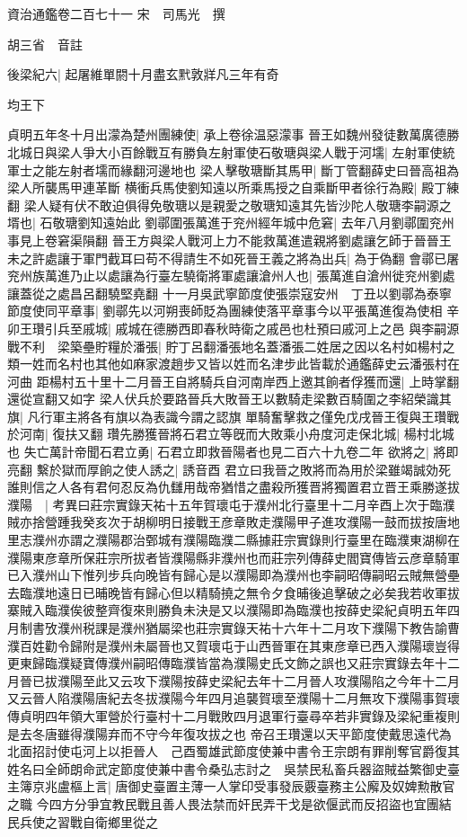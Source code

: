 資治通鑑卷二百七十一
宋　司馬光　撰

胡三省　音註

後梁紀六|{
	起屠維單閼十月盡玄黓敦牂凡三年有奇}


均王下

貞明五年冬十月出濛為楚州團練使|{
	承上卷徐温惡濛事}
晉王如魏州發徒數萬廣德勝北城日與梁人爭大小百餘戰互有勝負左射軍使石敬瑭與梁人戰于河壖|{
	左射軍使統軍士之能左射者壖而緣翻河邊地也}
梁人擊敬瑭斷其馬甲|{
	斷丁管翻薛史曰晉高祖為梁人所襲馬甲連革斷}
横衝兵馬使劉知遠以所乘馬授之自乘斷甲者徐行為殿|{
	殿丁練翻}
梁人疑有伏不敢迫俱得免敬瑭以是親愛之敬瑭知遠其先皆沙陀人敬瑭李嗣源之壻也|{
	石敬瑭劉知遠始此}
劉鄩圍張萬進于兖州經年城中危窘|{
	去年八月劉鄩圍兖州事見上卷窘渠隕翻}
晉王方與梁人戰河上力不能救萬進遣親將劉處讓乞師于晉晉王未之許處讓于軍門截耳曰苟不得請生不如死晉王義之將為出兵|{
	為于偽翻}
會鄩已屠兖州族萬進乃止以處讓為行臺左驍衛將軍處讓滄州人也|{
	張萬進自滄州徙兖州劉處讓蓋從之處昌呂翻驍堅堯翻}
十一月吳武寧節度使張崇寇安州　丁丑以劉鄩為泰寧節度使同平章事|{
	劉鄩先以河朔喪師貶為團練使落平章事今以平張萬進復為使相}
辛卯王瓚引兵至戚城|{
	戚城在德勝西即春秋時衛之戚邑也杜預曰戚河上之邑}
與李嗣源戰不利　梁築壘貯糧於潘張|{
	貯丁呂翻潘張地名蓋潘張二姓居之因以名村如楊村之類一姓而名村也其他如麻家渡趙步又皆以姓而名津步此皆載於通鑑薛史云潘張村在河曲}
距楊村五十里十二月晉王自將騎兵自河南岸西上邀其餉者俘獲而還|{
	上時掌翻還從宣翻又如字}
梁人伏兵於要路晉兵大敗晉王以數騎走梁數百騎圍之李紹榮識其旗|{
	凡行軍主將各有旗以為表識今謂之認旗}
單騎奮擊救之僅免戊戌晉王復與王瓚戰於河南|{
	復扶又翻}
瓚先勝獲晉將石君立等旣而大敗乘小舟度河走保北城|{
	楊村北城也}
失亡萬計帝聞石君立勇|{
	石君立即救晉陽者也見二百六十九卷二年}
欲將之|{
	將即亮翻}
繫於獄而厚餉之使人誘之|{
	誘音酉}
君立曰我晉之敗將而為用於梁雖竭誠効死誰則信之人各有君何忍反為仇讎用哉帝猶惜之盡殺所獲晋將獨置君立晋王乘勝遂拔濮陽　|{
	考異曰莊宗實錄天祐十五年賀瓌屯于濮州北行臺里十二月辛酉上次于臨濮賊亦捨營踵我癸亥次于胡柳明日接戰王彦章敗走濮陽甲子進攻濮陽一鼓而拔按唐地里志濮州亦謂之濮陽郡治鄄城有濮陽臨濮二縣據莊宗實錄則行臺里在臨濮東湖柳在濮陽東彦章所保莊宗所拔者皆濮陽縣非濮州也而莊宗列傳薛史閻寶傳皆云彦章騎軍已入濮州山下惟列步兵向晚皆有歸心是以濮陽即為濮州也李嗣昭傳嗣昭云賊無營壘去臨濮地遠日已晡晚皆有歸心但以精騎撓之無令夕食晡後追擊破之必矣我若收軍拔寨賊入臨濮俟彼整齊復來則勝負未決是又以濮陽即為臨濮也按薛史梁紀貞明五年四月制書攷濮州税課是濮州猶屬梁也莊宗實錄天祐十六年十二月攻下濮陽下教告諭曹濮百姓勸令歸附是濮州未屬晉也又賀瓌屯于山西晉軍在其東彦章已西入濮陽瓌豈得更東歸臨濮疑寶傳濮州嗣昭傳臨濮皆當為濮陽史氏文飾之誤也又莊宗實錄去年十二月晉已拔濮陽至此又云攻下濮陽按薛史梁紀去年十二月晉人攻濮陽陷之今年十二月又云晉人陷濮陽唐紀去冬拔濮陽今年四月追襲賀瓌至濮陽十二月無攻下濮陽事賀瓌傳貞明四年領大軍營於行臺村十二月戰敗四月退軍行臺尋卒若非實錄及梁紀重複則是去冬唐雖得濮陽弃而不守今年復攻拔之也}
帝召王瓚還以天平節度使戴思遠代為北面招討使屯河上以拒晉人　己酉蜀雄武節度使兼中書令王宗朗有罪削奪官爵復其姓名曰全師朗命武定節度使兼中書令桑弘志討之　吳禁民私畜兵器盜賊益繁御史臺主簿京兆盧樞上言|{
	唐御史臺置主薄一人掌印受事發辰覈臺務主公廨及奴婢勲散官之職}
今四方分爭宜教民戰且善人畏法禁而奸民弄干戈是欲偃武而反招盜也宜團結民兵使之習戰自衛鄉里從之

